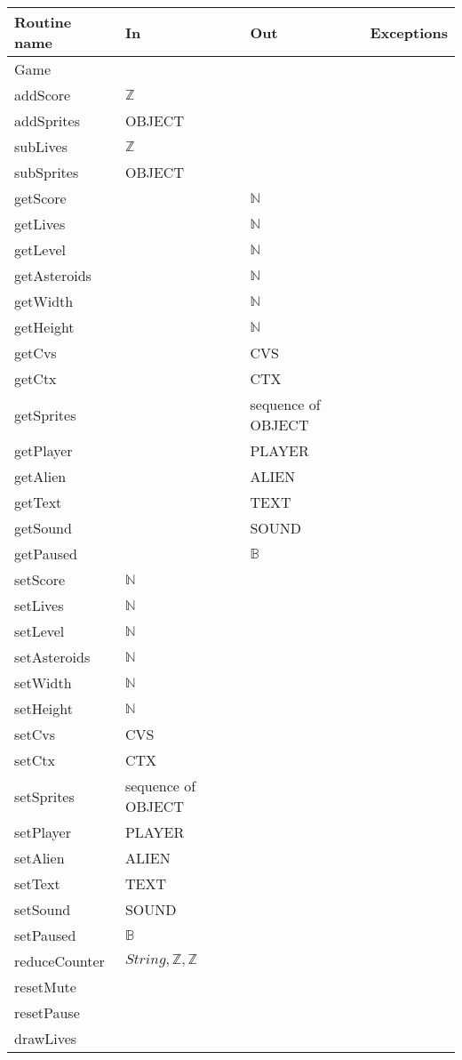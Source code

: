 \documentclass[12pt]{article}
\begin{document}
\newpage %

\begin{tabular}{| l | l | l | l |}
\hline
\textbf{Routine name} & \textbf{In} & \textbf{Out} & \textbf{Exceptions}\\
\hline
Game &  & ~\\
\hline
addScore & $\mathbb{Z}$ &  & ~\\
\hline
addSprites & OBJECT &  & ~\\
\hline
subLives & $\mathbb{Z}$ &  & ~\\
\hline
subSprites & OBJECT &  & ~\\
\hline
getScore &  & $\mathbb{N}$  & ~\\
\hline
getLives &  & $\mathbb{N}$  & ~\\
\hline
getLevel &  & $\mathbb{N}$  & ~\\
\hline
getAsteroids &  & $\mathbb{N}$  & ~\\
\hline
getWidth &  & $\mathbb{N}$  & ~\\
\hline
getHeight &  & $\mathbb{N}$  & ~\\
\hline
getCvs &  & CVS  & ~\\
\hline
getCtx &  & CTX  & ~\\
\hline
getSprites &  & sequence of OBJECT  & ~\\
\hline
getPlayer &  & PLAYER  & ~\\
\hline
getAlien &  & ALIEN  & ~\\
\hline
getText &  & TEXT  & ~\\
\hline
getSound &  & SOUND  & ~\\
\hline
getPaused &  & $\mathbb{B}$  & ~\\
\hline
setScore & $\mathbb{N}$ &  & ~\\
\hline
setLives & $\mathbb{N}$ &  & ~\\
\hline
setLevel & $\mathbb{N}$ &  & ~\\
\hline
setAsteroids & $\mathbb{N}$ &  & ~\\
\hline
setWidth & $\mathbb{N}$ &  & ~\\
\hline
setHeight & $\mathbb{N}$ &  & ~\\
\hline
setCvs & CVS &  & ~\\
\hline
setCtx & CTX &  & ~\\
\hline
setSprites & sequence of OBJECT &  & ~\\
\hline
setPlayer & PLAYER &  & ~\\
\hline
setAlien & ALIEN &  & ~\\
\hline
setText & TEXT &  & ~\\
\hline
setSound & SOUND &  & ~\\
\hline
setPaused & $\mathbb{B}$ &  & ~\\
\hline
reduceCounter & $String, \mathbb{Z}, \mathbb{Z}$ &  & ~\\
\hline
resetMute &  &  & ~\\
\hline
resetPause &  &  & ~\\
\hline
drawLives &  &  & ~\\
\hline
\end{tabular}
\end{document}
